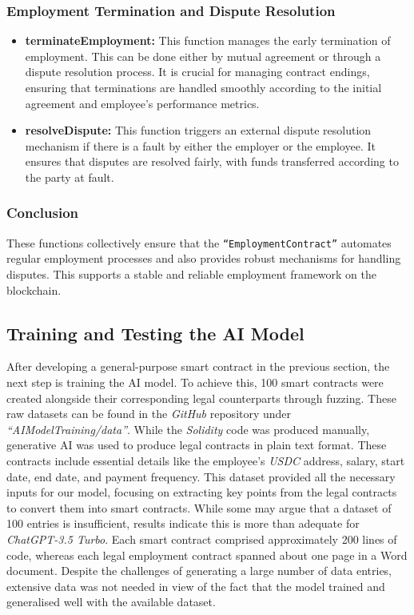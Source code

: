 \subsubsection{Employment Termination and Dispute Resolution}

\begin{itemize}
    \item \textbf{terminateEmployment:} This function manages the early termination of employment. This can be done either by mutual agreement or through a dispute resolution process. It is crucial for managing contract endings, ensuring that terminations are handled smoothly according to the initial agreement and employee's performance metrics.
    \item \textbf{resolveDispute:} This function triggers an external dispute resolution mechanism if there is a fault by either the employer or the employee. It ensures that disputes are resolved fairly, with funds transferred according to the party at fault. 
\end{itemize}

\subsubsection{Conclusion}

These functions collectively ensure that the \texttt{``EmploymentContract''} automates regular employment processes and also provides robust mechanisms for handling disputes. This supports a stable and reliable employment framework on the blockchain.

\subsection{Training and Testing the AI Model}

After developing a general-purpose smart contract in the previous section, the next step is training the AI model. To achieve this, 100 smart contracts were created alongside their corresponding legal counterparts through fuzzing. These raw datasets can be found in the \textit{GitHub} repository under \textit{``AIModelTraining/data''}. While the \textit{Solidity} code was produced manually, generative AI was used to produce legal contracts in plain text format. These contracts include essential details like the employee's \textit{USDC} address, salary, start date, end date, and payment frequency. This dataset provided all the necessary inputs for our model, focusing on extracting key points from the legal contracts to convert them into smart contracts. While some may argue that a dataset of 100 entries is insufficient, results indicate this is more than adequate for \textit{ChatGPT-3.5 Turbo}. Each smart contract comprised approximately 200 lines of code, whereas each legal employment contract spanned about one page in a Word document. Despite the challenges of generating a large number of data entries, extensive data was not needed in view of the fact that the model trained and generalised well with the available dataset.

